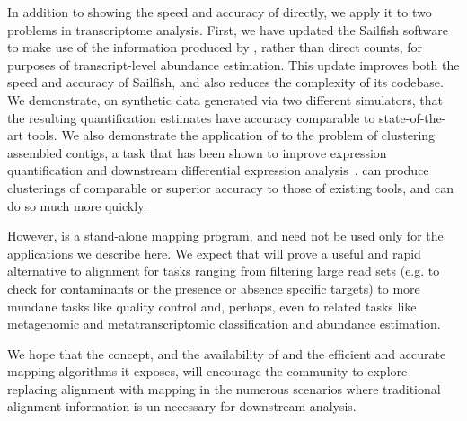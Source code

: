 In addition to showing the speed and accuracy of \qm directly, we apply it to two problems in transcriptome analysis. First, we have updated the Sailfish software to make use of the \qm information produced by \rapmap, rather than direct \kmer counts, for purposes of transcript-level abundance estimation.  This update improves both the speed and accuracy of Sailfish, and also reduces the complexity of its codebase. We demonstrate, on synthetic data generated via two different simulators, that the resulting quantification estimates have accuracy comparable to state-of-the-art tools. We also demonstrate the application of \rapmap to the problem of clustering \denovo assembled contigs, a task that has been shown to improve expression quantification and downstream differential expression analysis~\citep{corset}. \rapmap can produce clusterings of comparable or superior accuracy to those of existing tools, and can do so much more quickly.

However, \rapmap is a stand-alone mapping program, and need not be used only for the applications we describe here.  We expect that \qm will prove a useful and rapid alternative to alignment for tasks ranging from filtering large read sets (e.g. to check for contaminants or the presence or absence specific targets) to more mundane tasks like quality control and, perhaps, even to related tasks like metagenomic and metatranscriptomic classification and abundance estimation.

We hope that the \qm concept, and the availability of \rapmap and the efficient and accurate mapping algorithms it exposes, will encourage the community to explore replacing alignment with mapping in the numerous scenarios where traditional alignment information is un-necessary for downstream analysis.